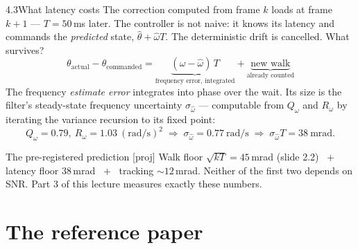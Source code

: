 \documentclass[10pt]{beamer}
\newcommand{\proj}[1]{\textcolor{green!35!black}{[proj#1]}}
\newcommand{\srcline}[1]{\par\vfill\noindent{\tiny\textcolor{gray}{Source: #1}}}
\begin{document}
\begin{frame}{4.3\quad What latency costs}
The correction computed from frame $k$ loads at frame $k{+}1$ ---
$T=50$\,ms later. The controller is not naive: it knows its latency and
commands the \emph{predicted} state, $\hat\theta+\hat\omega T$. The
deterministic drift is cancelled. What survives?
\[
\theta_{\text{actual}}-\theta_{\text{commanded}}
=\underbrace{(\omega-\hat\omega)\,T}_{\text{frequency error, integrated}}
+\underbrace{\text{new walk}}_{\text{already counted}}
\]
The frequency \emph{estimate error} integrates into phase over the wait.
Its size is the filter's steady-state frequency uncertainty
$\sigma_{\hat\omega}$ --- computable from $Q_\omega$ and $R_\omega$ by
iterating the variance recursion to its fixed point:
\[
Q_\omega=0.79,\ R_\omega=1.03\ (\text{rad/s})^2
\;\Rightarrow\;
\sigma_{\hat\omega}=0.77\ \text{rad/s}
\;\Rightarrow\;
\sigma_{\hat\omega}T=38\ \text{mrad}.
\]
\begin{block}{The pre-registered prediction \proj{}}
Walk floor $\sqrt{kT}=45$\,mrad (slide 2.2) $\;+\;$ latency floor
38\,mrad $\;+\;$ tracking ${\sim}12$\,mrad. Neither of the first two
depends on SNR. Part 3 of this lecture measures exactly these numbers.
\end{block}
\srcline{Riccati fixed point: standard; this decomposition of a closed sync loop: this project (no counterpart in [RN23], whose updates are instantaneous).}
\end{frame}

\section{The reference paper}
\end{document}
